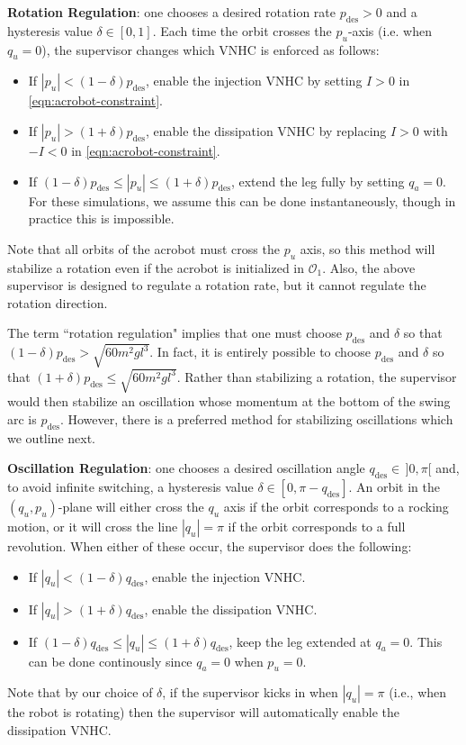 \documentclass[journal,twoside,web, twocolumn,draftcls]{ieeecolor}
\begin{document}
\textbf{Rotation Regulation}: one chooses a desired rotation rate 
\(p_\text{des} > 0\) and a hysteresis value \(\delta \in [0,1]\).
Each time the orbit crosses the \(p_u\)-axis (i.e. when \(q_u = 0\)), the
supervisor changes which VNHC is enforced as follows:
\begin{itemize}
    \item If \(|p_u| < (1-\delta)p_\text{des}\), enable the injection VNHC by
        setting \(I > 0\) in \eqref{eqn:acrobot-constraint}.
    \item If \(|p_u| > (1+\delta)p_\text{des}\), enable the dissipation VNHC by
        replacing \(I > 0\) with \(-I < 0\) in \eqref{eqn:acrobot-constraint}.
    \item If \((1-\delta)p_\text{des} \leq |p_u| \leq (1+\delta)p_\text{des}\),
        extend the leg fully by setting \(q_a = 0\).
        For these simulations, we assume this can be done instantaneously,
        though in practice this is impossible.
\end{itemize}
Note that all orbits of the acrobot must cross the \(p_u\) axis, 
so this method will stabilize a rotation even if the acrobot is initialized in
\(\mathcal{O}_1\).
Also, the above supervisor is designed to regulate a rotation rate, but it
cannot regulate the rotation direction.

The term ``rotation regulation" implies that one must choose
\(p_\text{des}\) and \(\delta\) so that 
\((1-\delta) p_\text{des} > \sqrt{60m^2gl^3}\).
In fact, it is entirely possible to choose \(p_\text{des}\) and \(\delta\) so
that \((1+\delta)p_\text{des} \leq \sqrt{60m^2gl^3}\).
Rather than stabilizing a rotation, the supervisor would then stabilize an
oscillation whose momentum at the bottom of the swing arc is \(p_\text{des}\).
However, there is a preferred method for stabilizing oscillations
which we outline next.

\textbf{Oscillation Regulation}: one chooses a desired oscillation angle 
\(q_\text{des} \in \, ]0,\pi[\) and, to avoid infinite switching, a
hysteresis value \(\delta \in [0,\pi - q_\text{des}]\).
An orbit in the \((q_u,p_u)\)-plane will either cross the \(q_u\) axis if the
orbit corresponds to a rocking motion, or it will cross the line \(|q_u| = \pi\)
if the orbit corresponds to a full revolution.
When either of these occur, the supervisor does the following: 
\begin{itemize}
    \item If \(|q_u| < (1-\delta)q_\text{des}\), enable the injection VNHC.
    \item If \(|q_u| > (1+\delta)q_\text{des}\), enable the dissipation VNHC.
    \item If \((1-\delta)q_\text{des} \leq |q_u| \leq (1+\delta)q_\text{des}\),
        keep the leg extended at \(q_a = 0\). This can be done continously since
        \(q_a = 0\) when \(p_u = 0\).
\end{itemize}
Note that by our choice of \(\delta\), if the supervisor kicks in when 
\(|q_u| = \pi\) (i.e., when the robot is rotating) then the supervisor will
automatically enable the dissipation VNHC.
\end{document}
